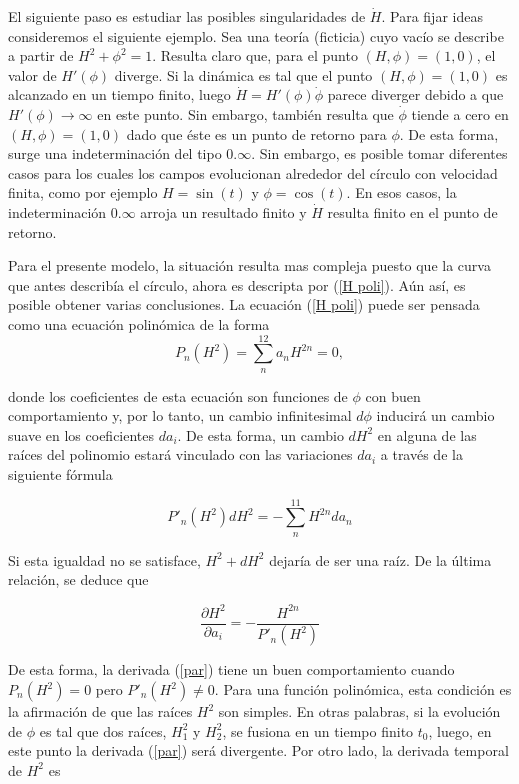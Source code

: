 El siguiente paso es estudiar las posibles singularidades de $\dot{H}$. Para fijar ideas consideremos el siguiente ejemplo. Sea una teoría (ficticia) cuyo vacío se describe a partir de $H^2+\phi^2=1$. Resulta claro que, para el punto $(H,\phi)=(1,0)$, el valor de $H'(\phi)$ diverge. Si la dinámica es tal que el punto $(H,\phi)=(1,0)$ es alcanzado en un tiempo finito, luego $\dot{H}=H'(\phi)\dot{\phi}$ parece diverger debido a que  $H'(\phi)\to\infty$ en este punto. Sin embargo, también resulta que $\dot{\phi}$ tiende a cero en $(H, \phi)=(1, 0)$ dado que éste es un punto de retorno para $\phi$. De esta forma, surge una indeterminación del tipo $0.\infty$. Sin embargo, es posible tomar diferentes casos para los cuales los campos evolucionan alrededor del círculo con velocidad finita, como por ejemplo $H=\sin(t)$ y $\phi=\cos(t)$. En esos casos, la indeterminación $0.\infty$ arroja un resultado finito y $\dot{H}$ resulta finito en el punto de retorno.

Para el presente modelo, la situación resulta mas compleja puesto que la curva que antes describía el círculo, ahora es descripta por (\ref{H poli}). Aún así, es posible obtener varias conclusiones. La ecuación (\ref{H poli}) puede ser pensada como una ecuación polinómica de la forma  
$$
P_n(H^2)=\sum_{n}^{12} a_n H^{2n}=0,
$$

donde los coeficientes de esta ecuación son funciones de $\phi$ con buen comportamiento y, por lo tanto, un cambio infinitesimal $d\phi$ inducirá un cambio suave en los coeficientes $da_i$. De esta forma, un cambio $dH^2$ en alguna de las raíces del polinomio estará vinculado con las variaciones $da_i$ a través de la siguiente fórmula

\begin{equation}\label{deri}
    P'_n(H^2) dH^2=-\sum_{n}^{11} H^{2n} da_n
\end{equation}



Si esta igualdad no se satisface, $H^2+dH^2$ dejaría de ser una raíz. De la última relación, se deduce que


\begin{equation}\label{par}
    \frac{\partial H^2}{\partial a_i}=-\frac{H^{2n}}{P'_n(H^2)}
\end{equation}


De esta forma, la derivada (\ref{par}) tiene un buen comportamiento cuando $P_n(H^2)=0$ pero $P'_n(H^2)\neq 0$. Para una función polinómica, esta condición es la afirmación de que las raíces $H^2$ son simples. En otras palabras, si la evolución de $\phi$ es tal que dos raíces, $H^2_1$ y $H^2_2$, se fusiona en un tiempo finito $t_{0}$, luego, en este punto la derivada (\ref{par}) será divergente. Por otro lado, la derivada temporal de $H^2$ es


